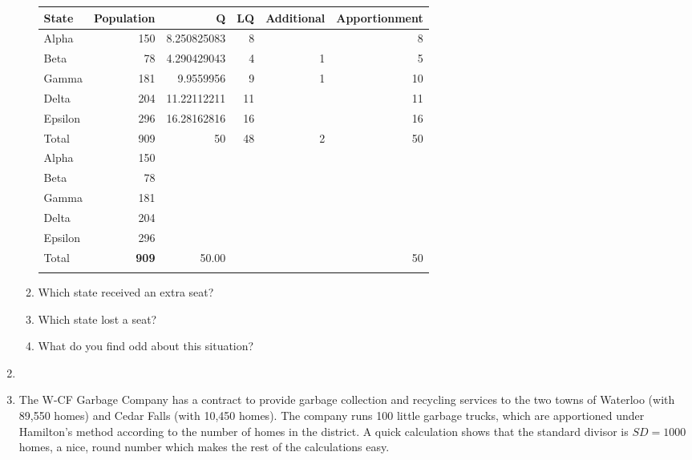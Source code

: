 \begin{enumerate}
\begin{enumerate}
	\begin{center}
\ifsolns \else	\large\fi
		\begin{tabular}{l|r|r|r|r|r} \hline
	State & Population & Q & LQ & Additional & Apportionment \\\hline
	\ifsolns
	Alpha  & 150 & 8.250825083 & 8 &  & 8\\\hline 
Beta  & 78 & 4.290429043 & 4 & 1 & 5\\\hline 
Gamma  & 181 & 9.9559956 & 9 & 1 & 10\\\hline 
Delta  & 204 & 11.22112211 & 11 &  & 11\\\hline 
Epsilon  & 296 & 16.28162816 & 16 &  & 16\\\hline \hline
Total  & 909 & 50 & 48 & 2 & 50 \\\hline 
\else
	Alpha & 150 &&&& \\\hline
	Beta & 78 &&&& \\\hline
	Gamma & 181 &&&& \\\hline
	Delta & 204 &&&& \\\hline
	Epsilon & 296 &&&& \\\hline \hline
	Total & \textbf{909} & 50.00 &  &  & 50 \\\hline\fi
	\end{tabular}
	\normalsize
	\end{center}

		\item Which state received an extra seat?\hrulefill
		\item Which state lost a seat?\hrulefill
		\item What do you find odd about this situation?\hrulefill{}
	\end{enumerate}
	\item {} 

\clearpage

	\item The W-CF Garbage Company has a contract to provide garbage collection and recycling services to the two towns of Waterloo (with 89,550 homes) and Cedar Falls (with 10,450 homes).  The company runs 100 little garbage trucks, which are apportioned under Hamilton's method according to the number of homes in the district.  A quick calculation shows that the standard divisor is $SD=1000$ homes, a nice, round number which makes the rest of the calculations easy.  
	

\end{enumerate}
